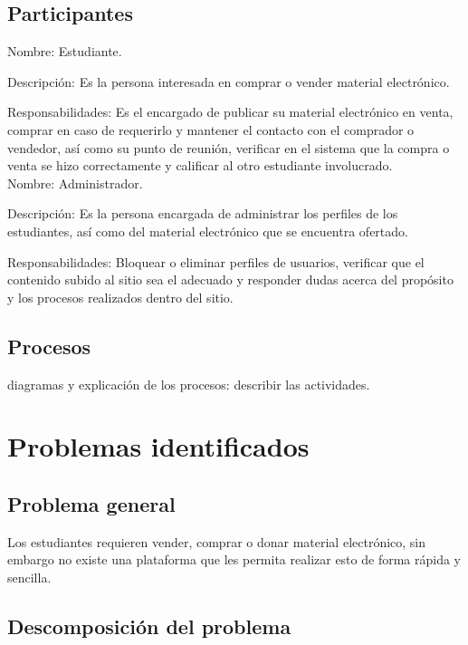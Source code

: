 \subsection{Participantes}

Nombre: Estudiante.

Descripción: Es la persona interesada en comprar o vender material electrónico.

Responsabilidades: Es el encargado de publicar su material electrónico en venta, comprar en caso de requerirlo y mantener el contacto con el comprador o vendedor, así como su punto de reunión, verificar en el sistema que la compra o venta se hizo correctamente y calificar al otro estudiante involucrado. \\

Nombre: Administrador.

Descripción: Es la persona encargada de administrar los perfiles de los estudiantes, así como del material electrónico que se encuentra ofertado.

Responsabilidades: Bloquear o eliminar perfiles de usuarios, verificar que el contenido subido al sitio sea el adecuado y responder dudas acerca del propósito y los procesos realizados dentro del sitio.

\subsection{Procesos}

diagramas y explicación de los procesos: describir las actividades.

\section{Problemas identificados}

\subsection{Problema general}

Los estudiantes requieren vender, comprar o donar material electrónico, sin embargo no existe una plataforma que les permita realizar esto de forma rápida y sencilla.

\subsection{Descomposición del problema}

